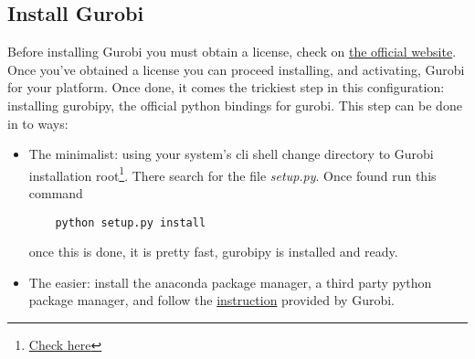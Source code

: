     \subsection{Install Gurobi}
        Before installing Gurobi you must obtain a license, check on \href{https://www.gurobi.com/}{the official website}. Once you've obtained a license you can proceed 
        installing, and activating, Gurobi for your platform. Once done, it comes the trickiest step in this configuration: installing gurobipy, the official python bindings 
        for gurobi. This step can be done in to ways:
            \begin{itemize}
                \item The minimalist: using your system's cli shell change directory to Gurobi installation root\footnote{\href{https://packages.gurobi.com/9.0/README.txt}{Check here}}. There search for the file \emph{setup.py}. Once found run this command
                \begin{lstlisting}
    python setup.py install
                \end{lstlisting}
                once this is done, it is pretty fast, gurobipy is installed and ready.
                \item The easier: install the anaconda package manager, a third party python package manager, 
                and follow the \href{https://www.gurobi.com/documentation/9.0/quickstart_mac/ins_the_anaconda_python_di.html}{instruction} 
                provided by Gurobi.
            \end{itemize}



